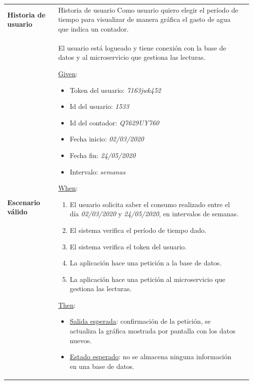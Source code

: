 \documentclass[pdftex,11pt,a4paper]{book}
\begin{document}
\begin{center}
\begin{longtable}{|>{\centering\arraybackslash}X m{2cm}|m{12cm}|}
\hline
\multicolumn{2}{|c|}{\textbf{Prueba de aceptación PA04}}\\
\hline 
\endhead

\textbf{Historia de usuario} & Historia de usuario	Como usuario quiero elegir el período de tiempo para visualizar de manera gráfica el gasto de agua que indica un contador.

\\ \hline

\textbf{Escenario válido} & {\raggedright El usuario está logueado y tiene conexión con la base de datos y al microservicio que gestiona las lecturas.\par}
\vspace{2mm}
\break

\underline{Given}:
\begin{itemize}
\addtolength{\itemsep}{-3mm}
\item Token del usuario: \textit{7163jwk452}
\item Id del usuario: \textit{1533}
\item Id del contador: \textit{Q7629UY760}
\item Fecha inicio: \textit{02/03/2020}
\item Fecha fin: \textit{24/05/2020}
\item Intervalo: \textit{semanas}

\end{itemize}
\vspace{3mm}

\underline{When}:
\begin{enumerate}
\vspace{-3mm}
\addtolength{\itemsep}{-3mm}
\item El usuario solicita saber el consumo realizado entre el día \textit{02/03/2020} y \textit{24/05/2020}, en intervalos de semanas.
\item El sistema verifica el período de tiempo dado.
\item El sistema verifica el token del usuario.
\item La aplicación hace una petición a la base de datos. 
\item La aplicación hace una petición al microservicio que gestiona las lecturas.
\end{enumerate}
\break

\underline{Then}:
\vspace{-3mm}
\begin{itemize}
\addtolength{\itemsep}{-3mm}
\item \underline{Salida esperada}: confirmación de la petición, se actualiza la gráfica mostrada por pantalla con los datos nuevos.
\item \underline{Estado esperado}: no se almacena ninguna información en una base de datos.
\end{itemize}


\end{longtable}
\end{center}
\end{document}
